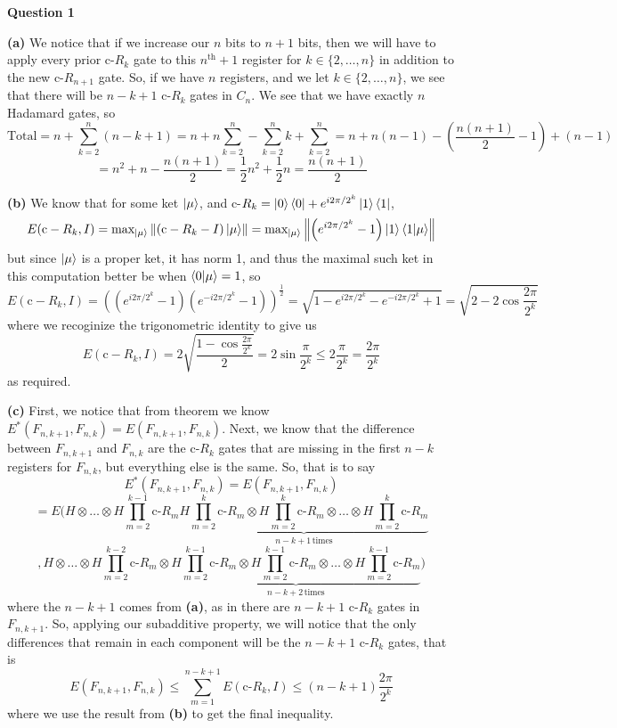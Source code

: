 \documentclass[10pt]{article}
\newcommand{\norm}[1]{\left\lVert#1\right\rVert}
\newcommand{\Que}[1]{\textbf{Question #1}}
\begin{document}
\Que{1}

\textbf{(a)} We notice that if we increase our $n$ bits to $n+1$ bits, then we will have to apply every prior c-$R_{k}$ gate to this $n^{\text{th}}+1$ register for $k \in \{2,\dots,n\}$ in addition to the new c-$R_{n+1}$ gate. So, if we have $n$ registers, and we let $k\in \{2, \dots, n\}$, we see that there will be $n - k + 1$ c-$R_{k}$ gates in $C_{n}$. We see that we have exactly $n$ Hadamard gates, so
\[ \text{Total} = n + \sum_{k=2}^{n}(n - k + 1) = n + n\sum_{k=2}^{n} - \sum_{k=2}^{n}k + \sum_{k=2}^{n} = n + n(n-1) - \left(\frac{n(n+1)}{2} - 1\right) + (n-1)\]
\[ = n^{2} + n - \frac{n(n+1)}{2} = \frac{1}{2}n^{2} + \frac{1}{2}n = \frac{n(n+1)}{2}\]

\textbf{(b)} We know that for some ket $\ket{\mu}$, and c-$R_{k} = \ket{0}\bra{0} + e^{i2\pi/2^{k}}\ket{1}\bra{1}$, 
\[ E(\text{c}-R_{k},I) = \text{max}_{\ket{\mu}}\norm{(\text{c}-R_{k} - I)\ket{\mu}} = \text{max}_{\ket{\mu}}\norm{\left(e^{i2\pi/2^{k}}-1\right)\ket{1}\braket{1|\mu}}\]
but since $\ket{\mu}$ is a proper ket, it has norm 1, and thus the maximal such ket in this computation better be when $\braket{0|\mu} = 1$, so
\[ E(\text{c}-R_{k},I) = \left(\left(e^{i2\pi/2^{k}}-1\right)\left(e^{-i2\pi/2^{k}}-1\right)\right)^{\frac{1}{2}} = \sqrt{1 - e^{i2\pi/2^{k}} - e^{-i2\pi/2^{k}} + 1} = \sqrt{2 - 2\cos\frac{2\pi}{2^{k}}} \]
where we recoginize the trigonometric identity to give us
\[ E(\text{c}-R_{k},I) = 2\sqrt{\frac{1 - \cos\frac{2\pi}{2^{k}}}{2}} = 2 \sin\frac{\pi}{2^{k}} \leq 2\frac{\pi}{2^{k}} = \frac{2\pi}{2^{k}} \]
as required.

\textbf{(c)} First, we notice that from theorem we know $E^{*}(F_{n,k+1},F_{n,k}) = E(F_{n,k+1},F_{n,k})$. Next, we know that the difference between $F_{n,k+1}$ and $F_{n,k}$ are the c-$R_{k}$ gates that are missing in the first $n-k$ registers for $F_{n,k}$, but everything else is the same. So, that is to say
\[ E^{*}(F_{n,k+1},F_{n,k}) = E(F_{n,k+1},F_{n,k})\]
\[ = E(H \otimes \dots \otimes H\prod_{m=2}^{k-1}\text{c-}R_{m}\underbrace{H\prod_{m=2}^{k}\text{c-}R_{m}\otimes H\prod_{m=2}^{k}\text{c-}R_{m}\otimes \dots \otimes H\prod_{m=2}^{k}\text{c-}R_{m}}_{n-k+1 \, \text{times}}\]
\[ ,H \otimes \dots \otimes H\prod_{m=2}^{k-2}\text{c-}R_{m}\otimes  \underbrace{H\prod_{m=2}^{k-1}\text{c-}R_{m}\otimes H\prod_{m=2}^{k-1}\text{c-}R_{m}\otimes \dots \otimes H\prod_{m=2}^{k-1}\text{c-}R_{m}}_{n-k + 2 \, \text{times}})
\]
where the $n-k+1$ comes from \textbf{(a)}, as in there are $n-k+1$ c-$R_{k}$ gates in $F_{n,k+1}$. So, applying our subadditive property, we will notice that the only differences that remain in each component will be the $n-k+1$ c-$R_{k}$ gates, that is
\[ E(F_{n,k+1},F_{n,k}) \leq \sum_{m=1}^{n-k+1}E(\text{c-}R_{k},I) \leq (n-k+1)\frac{2\pi}{2^{k}} \]
where we use the result from \textbf{(b)} to get the final inequality.
\end{document}
